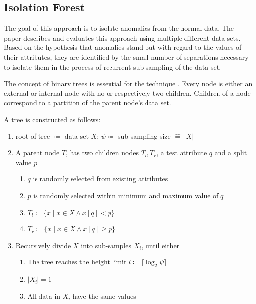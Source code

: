 \subsection{Isolation Forest}
The goal of this approach is to isolate anomalies from the normal data. The paper \cite{liu2008isolation} describes and evaluates this approach using multiple different data sets.
Based on the hypothesis that anomalies stand out with regard to the values of their attributes, they are identified by the small number of separations necessary to isolate them in the process of recurrent sub-sampling of the data set.

The concept of binary trees is essential for the technique .
Every node is either an external or internal node with no or respectively two children. 
Children of a node correspond to a partition of the parent node's data set.

A tree is constructed as follows:
\begin{enumerate}
    \item root of tree $\coloneqq$ data set $X$; $\psi \coloneqq$ sub-sampling size $\widehat{=}$ $|X|$
    \item A parent node $T$, has two children nodes $T_l, T_r$, a test attribute $q$ and a split value $p$
    \begin{enumerate}
        \item $q$ is randomly selected from existing attributes
        \item $p$ is randomly selected within minimum and maximum value of $q$
        \item $T_l \coloneqq \{x \mid x \in X \wedge x[q] < p\}$
        \item $T_r \coloneqq \{x \mid x \in X \wedge x[q] \ge p\}$
    \end{enumerate}
    \item Recursively divide $X$ into sub-samples $X_i$, until either
    \begin{enumerate}
        \item The tree reaches the height limit $l \coloneqq \lceil \log_2 \psi \rceil$
        \item $\vert X_i \vert = 1$
        \item All data in $X_i$ have the same values
    \end{enumerate}    
\end{enumerate}

